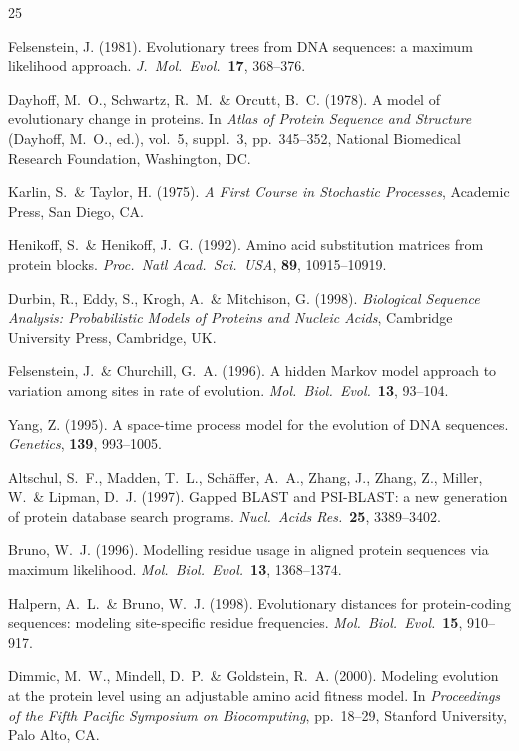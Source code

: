 \documentclass[12pt]{article}
\begin{document}
\begin{thebibliography}{25}

Felsenstein, J. (1981). Evolutionary trees from DNA sequences: a maximum likelihood approach.
\textit{J.\ Mol.\ Evol.}\ \textbf{17}, 368--376.

Dayhoff, M.~O., Schwartz, R.~M.\ \& Orcutt, B.~C. (1978). A model of evolutionary change in
proteins. In \textit{Atlas of Protein Sequence and Structure} (Dayhoff, M.~O., ed.), vol.~5,
suppl.~3, pp.~345--352, National Biomedical Research Foundation, Washington, DC.

Karlin, S.\ \& Taylor, H. (1975). \textit{A First Course in Stochastic Processes}, Academic Press,
San Diego, CA.

Henikoff, S.\ \& Henikoff, J.~G. (1992). Amino acid substitution matrices from protein blocks.
\textit{Proc.\ Natl Acad.\ Sci.\ USA}, \textbf{89}, 10915--10919.

Durbin, R., Eddy, S., Krogh, A.\ \& Mitchison, G. (1998). \textit{Biological Sequence Analysis:
Probabilistic Models of Proteins and Nucleic Acids}, Cambridge University Press, Cambridge, UK.

Felsenstein, J.\ \& Churchill, G.~A. (1996). A hidden Markov model approach to variation among
sites in rate of evolution. \textit{Mol.\ Biol.\ Evol.}\ \textbf{13}, 93--104.

Yang, Z. (1995). A space-time process model for the evolution of DNA sequences. \textit{Genetics},
\textbf{139}, 993--1005.

Altschul, S.~F., Madden, T.~L., Sch\"affer, A.~A., Zhang, J., Zhang, Z., Miller, W.\ \& Lipman,
D.~J. (1997). Gapped BLAST and PSI-BLAST: a new generation of protein database search programs.
\textit{Nucl.\ Acids Res.}\ \textbf{25}, 3389--3402.

Bruno, W.~J. (1996). Modelling residue usage in aligned protein sequences via maximum likelihood.
\textit{Mol.\ Biol.\ Evol.}\ \textbf{13}, 1368--1374.

Halpern, A.~L.\ \& Bruno, W.~J. (1998). Evolutionary distances for protein-coding sequences:
modeling site-specific residue frequencies. \textit{Mol.\ Biol.\ Evol.}\ \textbf{15}, 910--917.

Dimmic, M.~W., Mindell, D.~P.\ \& Goldstein, R.~A. (2000). Modeling evolution at the protein level
using an adjustable amino acid fitness model. In \textit{Proceedings of the Fifth Pacific Symposium
on Biocomputing}, pp.~18--29, Stanford University, Palo Alto, CA.


\end{thebibliography}
\end{document}
